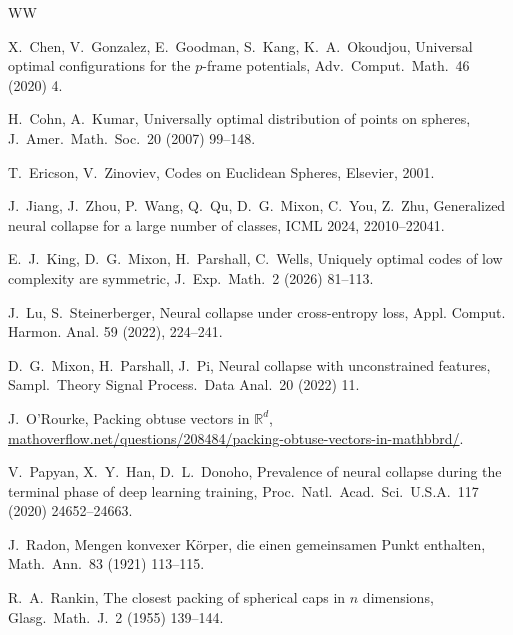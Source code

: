 \documentclass{article}
\theoremstyle{plain}
\theoremstyle{definition}
\begin{document}
\begin{thebibliography}{WW}

X.\ Chen, V.\ Gonzalez, E.\ Goodman, S.\ Kang, K.\ A.\ Okoudjou,
Universal optimal configurations for the $p$-frame potentials,
Adv.\ Comput.\ Math.\ 46 (2020) 4.

H.\ Cohn, A.\ Kumar,
Universally optimal distribution of points on spheres,
J.\ Amer.\ Math.\ Soc.\ 20 (2007) 99--148.

T.\ Ericson, V.\ Zinoviev,
Codes on Euclidean Spheres,
Elsevier, 2001.

J.\ Jiang, J.\ Zhou, P.\ Wang, Q.\ Qu, D.\ G.\ Mixon, C.\ You, Z.\ Zhu,
Generalized neural collapse for a large number of classes,
ICML 2024, 22010--22041.

E.\ J.\ King, D.\ G.\ Mixon, H.\ Parshall, C.\ Wells,
Uniquely optimal codes of low complexity are symmetric,
J.\ Exp.\ Math.\ 2 (2026) 81--113.

J.\ Lu, S.\ Steinerberger, Neural collapse under cross-entropy loss, Appl. Comput. Harmon. Anal. 59 (2022), 224--241.

D.\ G.\ Mixon, H.\ Parshall, J.\ Pi,
Neural collapse with unconstrained features,
Sampl.\ Theory Signal Process.\ Data Anal.\ 20 (2022) 11.

J.\ O'Rourke,
Packing obtuse vectors in $\mathbb{R}^d$,
\url{mathoverflow.net/questions/208484/packing-obtuse-vectors-in-mathbbrd/}.

V.\ Papyan, X.\ Y.\ Han, D.\ L.\ Donoho,
Prevalence of neural collapse during the terminal phase of deep learning training,
Proc.\ Natl.\ Acad.\ Sci.\ U.S.A.\ 117 (2020) 24652--24663.

J.\ Radon,
Mengen konvexer K\"{o}rper, die einen gemeinsamen Punkt enthalten,
Math.\ Ann.\ 83 (1921) 113--115.

R.\ A.\ Rankin,
The closest packing of spherical caps in $n$ dimensions,
Glasg.\ Math.\ J.\ 2 (1955) 139--144.

\end{thebibliography}
\end{document}
